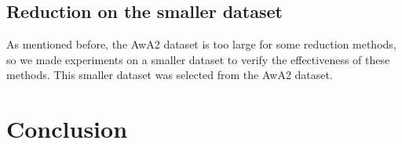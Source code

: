 \documentclass{article}
\begin{document}
\subsection{Reduction on the smaller dataset}
As mentioned before, the AwA2 dataset is too large for some reduction methods, so we made experiments on a smaller dataset to verify the effectiveness of these methods. This smaller dataset was selected from the AwA2 dataset.

\section{Conclusion}

  

\end{document}

